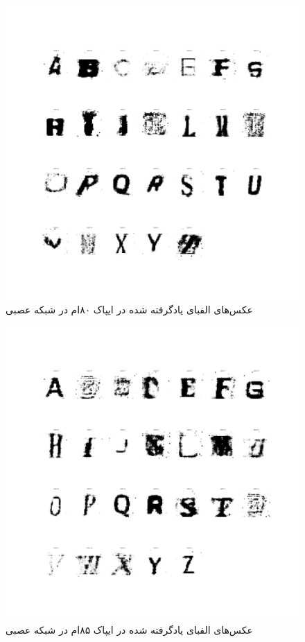 \documentclass{article}
\begin{document}
\begin{figure}[H]
	\centerline{\includegraphics[width=\textwidth , height=\textheight ]{../results/CGAN_Adam/figs/Alphabet_(Epoch=80)}}
	\caption{عکس‌های الفبای یادگرفته شده در ایپاک ۸۰ام در شبکه عصبی}
\end{figure}
\begin{figure}[H]
	\centerline{\includegraphics[width=\textwidth , height=\textheight ]{../results/CGAN_Adam/figs/Alphabet_(Epoch=85)}}
	\caption{عکس‌های الفبای یادگرفته شده در ایپاک ۸۵ام در شبکه عصبی}
\end{figure}
\end{document}
